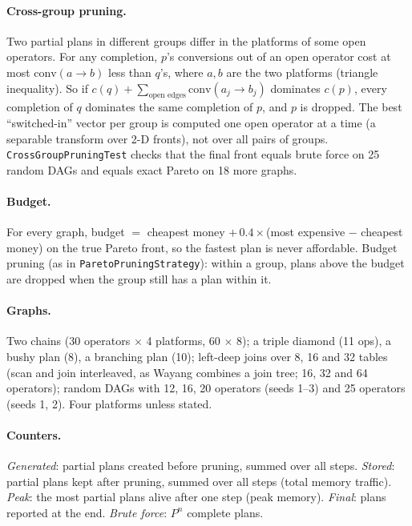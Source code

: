 \documentclass[10pt,a4paper]{article}
\begin{document}
\paragraph{Cross-group pruning.} Two partial plans in different groups differ in the platforms of some open
operators. For any completion, $p$'s conversions out of an open operator cost at most $\mathrm{conv}(a\to b)$ less
than $q$'s, where $a, b$ are the two platforms (triangle inequality). So if
$c(q) + \sum_{\text{open edges}} \mathrm{conv}(a_j \to b_j)$ dominates $c(p)$, every completion of $q$ dominates
the same completion of $p$, and $p$ is dropped. The best ``switched-in'' vector per group is computed one open operator
at a time (a separable transform over 2-D fronts), not over all pairs of groups. \texttt{CrossGroupPruningTest}
checks that the final front equals brute force on 25 random DAGs and equals exact Pareto on 18 more graphs.

\paragraph{Budget.} For every graph, budget $=$ cheapest money $+\,0.4\times$(most expensive $-$ cheapest money)
on the true Pareto front, so the fastest plan is never affordable. Budget pruning (as in \texttt{ParetoPruningStrategy}):
within a group, plans above the budget are dropped when the group still has a plan within it.

\paragraph{Graphs.} Two chains (30 operators $\times$ 4 platforms, 60 $\times$ 8); a triple diamond (11 ops), a bushy plan (8),
a branching plan (10); left-deep joins over 8, 16 and 32 tables (scan and join interleaved, as Wayang combines a
join tree; 16, 32 and 64 operators); random DAGs with 12, 16, 20 operators (seeds 1--3) and 25 operators
(seeds 1, 2). Four platforms unless stated.

\paragraph{Counters.} \emph{Generated}: partial plans created before pruning, summed over all steps. \emph{Stored}:
partial plans kept after pruning, summed over all steps (total memory traffic). \emph{Peak}: the most partial plans
alive after one step (peak memory). \emph{Final}: plans reported at the end. \emph{Brute force}: $P^{n}$ complete
plans.
\end{document}
